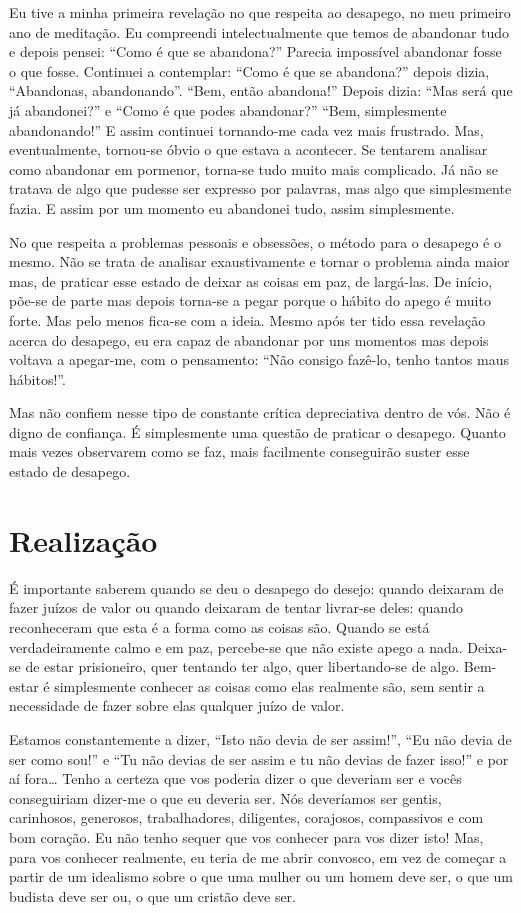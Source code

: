 Eu tive a minha primeira revelação no que respeita ao desapego, no meu primeiro
ano de meditação. Eu compreendi intelectualmente que temos de abandonar tudo e
depois pensei: “Como é que se abandona?” Parecia impossível abandonar fosse o
que fosse. Continuei a contemplar: “Como é que se abandona?” depois dizia,
“Abandonas, abandonando”. “Bem, então abandona!” Depois dizia: “Mas será que já
abandonei?” e “Como é que podes abandonar?” “Bem, simplesmente abandonando!” E
assim continuei tornando-me cada vez mais frustrado. Mas, eventualmente,
tornou-se óbvio o que estava a acontecer. Se tentarem analisar como abandonar em
pormenor, torna-se tudo muito mais complicado. Já não se tratava de algo que
pudesse ser expresso por palavras, mas algo que simplesmente fazia. E assim por
um momento eu abandonei tudo, assim simplesmente.

No que respeita a problemas pessoais e obsessões, o método para o desapego é o
mesmo. Não se trata de analisar exaustivamente e tornar o problema ainda maior
mas, de praticar esse estado de deixar as coisas em paz, de largá-las. De
início, põe-se de parte mas depois torna-se a pegar porque o hábito do apego é
muito forte. Mas pelo menos fica-se com a ideia. Mesmo após ter tido essa
revelação acerca do desapego, eu era capaz de abandonar por uns momentos mas
depois voltava a apegar-me, com o pensamento: “Não consigo fazê-lo, tenho tantos
maus hábitos!”.

Mas não confiem nesse tipo de constante crítica depreciativa dentro de vós. Não
é digno de confiança. É simplesmente uma questão de praticar o desapego. Quanto
mais vezes observarem como se faz, mais facilmente conseguirão suster esse
estado de desapego.

\section{Realização}

É importante saberem quando se deu o desapego do desejo: quando deixaram de
fazer juízos de valor ou quando deixaram de tentar livrar-se deles: quando
reconheceram que esta é a forma como as coisas são. Quando se está
verdadeiramente calmo e em paz, percebe-se que não existe apego a nada. Deixa-se
de estar prisioneiro, quer tentando ter algo, quer libertando-se de algo.
Bem-estar é simplesmente conhecer as coisas como elas realmente são, sem sentir
a necessidade de fazer sobre elas qualquer juízo de valor.

Estamos constantemente a dizer, “Isto não devia de ser assim!”, “Eu não devia de
ser como sou!” e “Tu não devias de ser assim e tu não devias de fazer isso!” e
por aí fora\ldots{} Tenho a certeza que vos poderia dizer o que deveriam ser e
vocês conseguiriam dizer-me o que eu deveria ser. Nós deveríamos ser gentis,
carinhosos, generosos, trabalhadores, diligentes, corajosos, compassivos e com
bom coração. Eu não tenho sequer que vos conhecer para vos dizer isto! Mas, para
vos conhecer realmente, eu teria de me abrir convosco, em vez de começar a
partir de um idealismo sobre o que uma mulher ou um homem deve ser, o que um
budista deve ser ou, o que um cristão deve ser.

